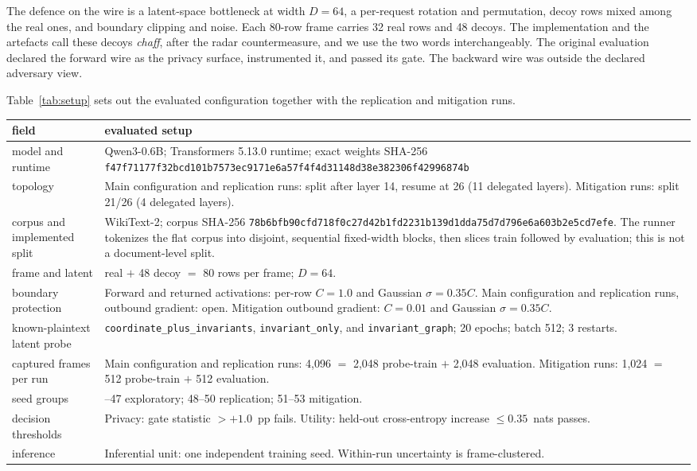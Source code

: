 \documentclass[11pt]{article}
\newcommand{\pp}{pp}
\begin{document}
The defence on the wire is a latent-space bottleneck at width $D{=}64$, a
per-request rotation and permutation, decoy rows mixed among the real ones,
and boundary clipping and noise. Each 80-row frame carries 32 real rows and 48
decoys. The implementation and the artefacts call these decoys \emph{chaff},
after the radar countermeasure, and we use the two words interchangeably. The original evaluation declared the forward wire as the privacy
surface, instrumented it, and passed its gate. The backward wire was outside the
declared adversary view.

Table~\ref{tab:setup} sets out the evaluated configuration together with the
replication and mitigation runs.

\begin{table}[H]
\centering\scriptsize
\renewcommand{\arraystretch}{1.12}
\begin{tabularx}{\textwidth}{@{}>{\raggedright\arraybackslash}p{2.45cm}>{\raggedright\arraybackslash}X@{}}
\toprule
field & evaluated setup \\
\midrule
model and runtime & Qwen3-0.6B; Transformers 5.13.0 runtime; exact weights
SHA-256
\texttt{f47f7117\allowbreak 7f32bcd1\allowbreak 01b7573e\allowbreak c9171e6a\allowbreak 57f4f4d3\allowbreak 1148d38e\allowbreak 382306f4\allowbreak 2996874b} \\
topology & Main configuration and replication runs: split after layer 14,
resume at 26 (11 delegated layers). Mitigation runs: split 21/26 (4 delegated
layers). \\
corpus and implemented split & WikiText-2; corpus SHA-256
\texttt{78b6bfb9\allowbreak 0cfd718f\allowbreak 0c27d42b\allowbreak 1fd2231b\allowbreak 139d1dda\allowbreak 75d7d796\allowbreak e6a603b2\allowbreak e5cd7efe}.
The runner tokenizes the flat corpus into disjoint,
sequential fixed-width blocks, then slices train followed by evaluation; this
is not a document-level split. \\
frame and latent & 32 real $+$ 48 decoy $=$ 80 rows per frame; $D{=}64$. \\
boundary protection & Forward and returned activations: per-row $C{=}1.0$ and
Gaussian $\sigma{=}0.35C$. Main configuration and replication runs, outbound
gradient: open. Mitigation outbound gradient: $C{=}0.01$ and Gaussian
$\sigma{=}0.35C$. \\
known-plaintext latent probe & \texttt{coordinate\_plus\_invariants},
\texttt{invariant\_only}, and \texttt{invariant\_graph}; 20 epochs; batch 512; 3
restarts. \\
captured frames per run & Main configuration and replication runs: 4,096 $=$
2,048 probe-train $+$ 2,048 evaluation. Mitigation runs: 1,024 $=$ 512
probe-train $+$ 512 evaluation. \\
seed groups & 42--47 exploratory; 48--50 replication; 51--53 mitigation. \\
decision thresholds & Privacy: gate statistic $> +1.0$~\pp{} fails. Utility:
held-out cross-entropy increase $\le 0.35$~nats passes. \\
inference & Inferential unit: one independent training seed. Within-run
uncertainty is frame-clustered. \\
\bottomrule
\end{tabularx}



\end{table}
\end{document}
